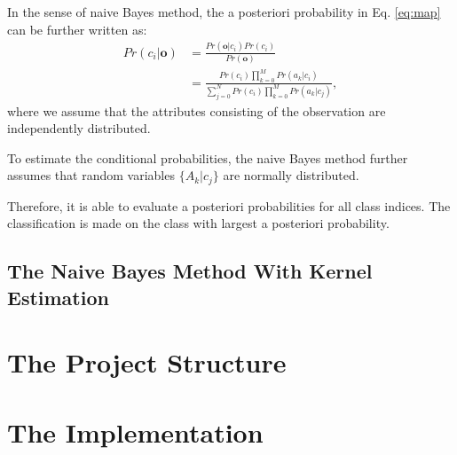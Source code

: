\documentclass[a4paper,12pt]{article}
\begin{document}
In the sense of naive Bayes method, the a posteriori probability in Eq. \ref{eq:map} can be further written as:
\begin{align}
    Pr(c_i|\mathbf{o}) & = \frac{Pr(\mathbf{o}|c_i)Pr(c_i)}{Pr(\mathbf{o})} \\
    & = \frac{ Pr(c_i) \prod_{k=0}^{M} { Pr(a_k|c_i) } } { \sum_{j=0}^{N} {Pr(c_i) \prod_{k=0}^{M}{Pr(a_k|c_j)} }},
\end{align}
where we assume that the attributes consisting of the observation are independently distributed.

To estimate the conditional probabilities, the naive Bayes method further assumes that random variables $\{A_k|c_j\}$ are normally distributed.

Therefore, it is able to evaluate a posteriori probabilities for all class indices. The classification is made on the class with largest a posteriori probability.

\subsection{The Naive Bayes Method With Kernel Estimation}

\section{The Project Structure}

\section{The Implementation}



\end{document}

